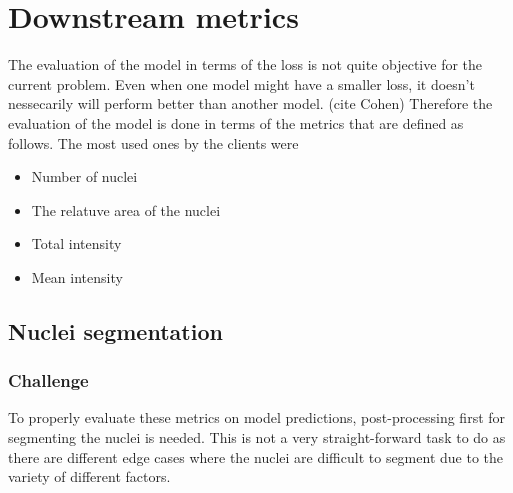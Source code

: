 \section{Downstream metrics}
The evaluation of the model in terms of the loss is not quite objective for the current problem. Even when one model might have a smaller loss, it doesn't nessecarily will perform better than another model. (cite Cohen) Therefore the evaluation of the model is done in terms of the metrics that are defined as follows. The most used ones by the clients were
\begin{itemize}
    \item Number of nuclei
    \item The relatuve area of the nuclei
    \item Total intensity
    \item Mean intensity
\end{itemize}

\subsection{Nuclei segmentation}
\subsubsection{Challenge}
To properly evaluate these metrics on model predictions, post-processing first for segmenting the nuclei is needed. This is not a very straight-forward task to do as there are different edge cases where the nuclei are difficult to segment due to the variety of different factors. 

